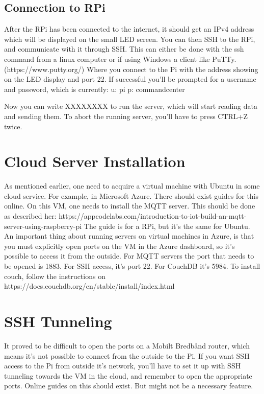 \documentclass{article}
\begin{document}
\subsection{Connection to RPi}
After the RPi has been connected to the internet, it should get an IPv4 address which will be displayed on the small LED screen. You can then SSH to the RPi, and communicate with it through SSH. This can either be done with the ssh command from a linux computer or if using Windows a client like PuTTy. (https://www.putty.org/)
Where you connect to the Pi with the address showing on the LED display and port 22.
If successful you’ll be prompted for a username and password, which is currently:
u: pi
p: commandcenter

Now you can write XXXXXXXX to run the server, which will start reading data and sending them. 
To abort the running server, you’ll have to press CTRL+Z twice.

\section{Cloud Server Installation}
As mentioned earlier, one need to acquire a virtual machine with Ubuntu in some cloud service. For example, in Microsoft Azure. There should exist guides for this online.
On this VM, one needs to install the MQTT server. This should be done as described her: 
https://appcodelabs.com/introduction-to-iot-build-an-mqtt-server-using-raspberry-pi
The guide is for a RPi, but it’s the same for Ubuntu.
An important thing about running servers on virtual machines in Azure, is that you must explicitly open ports on the VM in the Azure dashboard, so it’s possible to access it from the outside.
For MQTT servers the port that needs to be opened is 1883.
For SSH access, it’s port 22.
For CouchDB it’s 5984.
To install couch, follow the instructions on https://docs.couchdb.org/en/stable/install/index.html

\section{SSH Tunneling}
It proved to be difficult to open the ports on a Mobilt Bredbånd router, which means it’s not possible to connect from the outside to the Pi. If you want SSH access to the Pi from outside it’s network, you’ll have to set it up with SSH tunneling towards the VM in the cloud, and remember to open the appropriate ports. Online guides on this should exist. But might not be a necessary feature.
\end{document}
